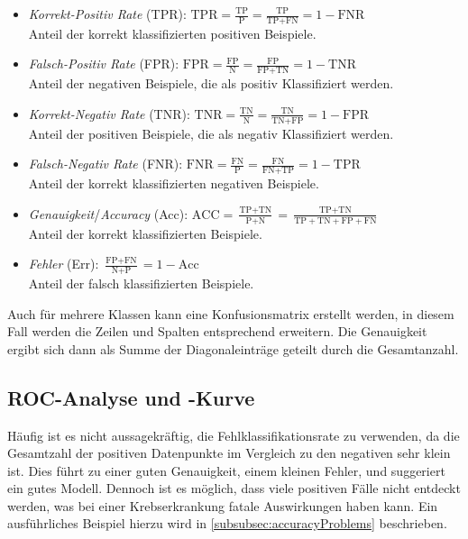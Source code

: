 			\begin{itemize}
				\item \emph{Korrekt-Positiv Rate} (TPR): \( \displaystyle   \text {TPR} ={\frac {\text {TP} }{\text {P} }}={\frac {\text {TP} }{\text {TP} +\text {FN} }}=1-\text {FNR}  \) \\
					Anteil der korrekt klassifizierten positiven Beispiele.
				\item \emph{Falsch-Positiv Rate} (FPR): \( \displaystyle  \text {FPR} ={\frac {\text {FP} }{\text {N} }}={\frac {\text {FP} }{\text {FP} +\text {TN} }}=1-\text {TNR} \) \\
					Anteil der negativen Beispiele, die als positiv Klassifiziert werden.
				\item \emph{Korrekt-Negativ Rate} (TNR): \( \displaystyle  \text {TNR} ={\frac {\text {TN} }{\text {N} }}={\frac {\text {TN} }{\text {TN} +\text {FP} }}=1-\text {FPR} \) \\
					Anteil der positiven Beispiele, die als negativ Klassifiziert werden.
				\item \emph{Falsch-Negativ Rate} (FNR): \( \displaystyle  \text {FNR} ={\frac {\text {FN} }{\text {P} }}={\frac {\text {FN} }{\text {FN} +\text {TP} }}=1-\text {TPR} \) \\
					Anteil der korrekt klassifizierten negativen Beispiele.
				\item \emph{Genauigkeit}/\emph{Accuracy} (Acc): \( \displaystyle  \text {ACC} ={\frac {\text {TP} +\text {TN} }{\text {P} +\text {N} }}={\frac {\text {TP} +\text {TN} }{\text {TP} +\text {TN} +\text {FP} +\text {FN} }} \) \\
					Anteil der korrekt klassifizierten Beispiele.
				\item \emph{Fehler} (Err): \( \displaystyle  \frac{\text{FP} + \text{FN}}{\text{N} + \text{P}} = 1 - \text{Acc} \) \\
					Anteil der falsch klassifizierten Beispiele.
			\end{itemize}
			Auch für mehrere Klassen kann eine Konfusionsmatrix erstellt werden, in diesem Fall werden die Zeilen und Spalten entsprechend erweitern. Die Genauigkeit ergibt sich dann als Summe der Diagonaleinträge geteilt durch die Gesamtanzahl.

		\subsection{ROC-Analyse und -Kurve}
			Häufig ist es nicht aussagekräftig, die Fehlklassifikationsrate zu verwenden, da die Gesamtzahl der positiven Datenpunkte im Vergleich zu den negativen sehr klein ist. Dies führt zu einer guten Genauigkeit, \bzw einem kleinen Fehler, und suggeriert ein gutes Modell. Dennoch ist es möglich, dass viele positiven Fälle nicht entdeckt werden, was \bspw bei einer Krebserkrankung fatale Auswirkungen haben kann. Ein ausführliches Beispiel hierzu wird in \autoref{subsubsec:accuracyProblems} beschrieben.

